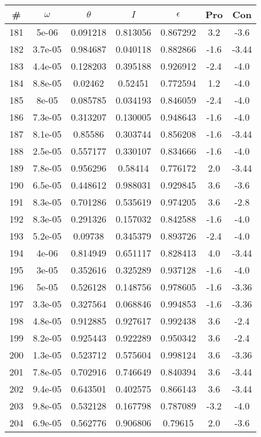 \begin{table}
\begin{tabular}{c|c|c|c|c|c|c}
\# & $\omega$ & $\theta$ & $I$ & $\epsilon$ & Pro & Con\\
\hline
181 & 5e-06 & 0.091218 & 0.813056 & 0.867292 & 3.2 & -3.6\\
182 & 3.7e-05 & 0.984687 & 0.040118 & 0.882866 & -1.6 & -3.44\\
183 & 4.4e-05 & 0.128203 & 0.395188 & 0.926912 & -2.4 & -4.0\\
184 & 8.8e-05 & 0.02462 & 0.52451 & 0.772594 & 1.2 & -4.0\\
185 & 8e-05 & 0.085785 & 0.034193 & 0.846059 & -2.4 & -4.0\\
186 & 7.3e-05 & 0.313207 & 0.130005 & 0.948643 & -1.6 & -4.0\\
187 & 8.1e-05 & 0.85586 & 0.303744 & 0.856208 & -1.6 & -3.44\\
188 & 2.5e-05 & 0.557177 & 0.330107 & 0.834666 & -1.6 & -4.0\\
189 & 7.8e-05 & 0.956296 & 0.58414 & 0.776172 & 2.0 & -3.44\\
190 & 6.5e-05 & 0.448612 & 0.988031 & 0.929845 & 3.6 & -3.6\\
191 & 8.3e-05 & 0.701286 & 0.535619 & 0.974205 & 3.6 & -2.8\\
192 & 8.3e-05 & 0.291326 & 0.157032 & 0.842588 & -1.6 & -4.0\\
193 & 5.2e-05 & 0.09738 & 0.345379 & 0.893726 & -2.4 & -4.0\\
194 & 4e-06 & 0.814949 & 0.651117 & 0.828413 & 4.0 & -3.44\\
195 & 3e-05 & 0.352616 & 0.325289 & 0.937128 & -1.6 & -4.0\\
196 & 5e-05 & 0.526128 & 0.148756 & 0.978605 & -1.6 & -3.36\\
197 & 3.3e-05 & 0.327564 & 0.068846 & 0.994853 & -1.6 & -3.36\\
198 & 4.8e-05 & 0.912885 & 0.927617 & 0.992438 & 3.6 & -2.4\\
199 & 8.2e-05 & 0.925443 & 0.922289 & 0.950342 & 3.6 & -2.4\\
200 & 1.3e-05 & 0.523712 & 0.575604 & 0.998124 & 3.6 & -3.36\\
201 & 7.8e-05 & 0.702916 & 0.746649 & 0.840394 & 3.6 & -3.44\\
202 & 9.4e-05 & 0.643501 & 0.402575 & 0.866143 & 3.6 & -3.44\\
203 & 9.8e-05 & 0.532128 & 0.167798 & 0.787089 & -3.2 & -4.0\\
204 & 6.9e-05 & 0.562776 & 0.906806 & 0.79615 & 2.0 & -3.6\\

\end{tabular}
\end{table}
